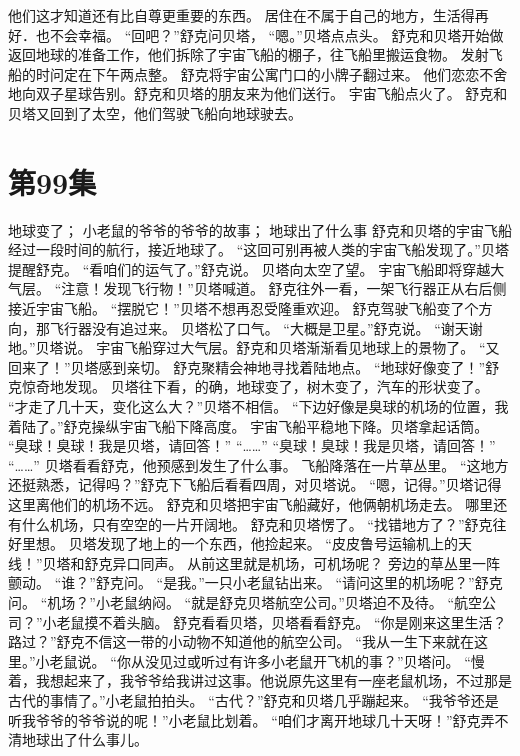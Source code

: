 \documentclass[a4paper,12pt,UTF8,twoside]{ctexbook}
\begin{document}
        他们这才知道还有比自尊更重要的东西。 
        居住在不属于自己的地方，生活得再好．也不会幸福。 
        “回吧？”舒克问贝塔， 
        “嗯。”贝塔点点头。 
        舒克和贝塔开始做返回地球的准备工作，他们拆除了宇宙飞船的棚子，往飞船里搬运食物。 
        发射飞船的时问定在下午两点整。 
        舒克将宇宙公寓门口的小牌子翻过来。 
        他们恋恋不舍地向双子星球告别。舒克和贝塔的朋友来为他们送行。 
        宇宙飞船点火了。 
        舒克和贝塔又回到了太空，他们驾驶飞船向地球驶去。   \chapter{第99集} 
        地球变了； 
        小老鼠的爷爷的爷爷的故事； 
        地球出了什么事   
        舒克和贝塔的宇宙飞船经过一段时间的航行，接近地球了。 
        “这回可别再被人类的宇宙飞船发现了。”贝塔提醒舒克。 
        “看咱们的运气了。”舒克说。 
        贝塔向太空了望。 
        宇宙飞船即将穿越大气层。 
        “注意！发现飞行物！”贝塔喊道。 
        舒克往外一看，一架飞行器正从右后侧接近宇宙飞船。 
        “摆脱它！”贝塔不想再忍受隆重欢迎。 
        舒克驾驶飞船变了个方向，那飞行器没有追过来。 
        贝塔松了口气。 
        “大概是卫星。”舒克说。 
        “谢天谢地。”贝塔说。 
        宇宙飞船穿过大气层。舒克和贝塔渐渐看见地球上的景物了。 
        “又回来了！”贝塔感到亲切。 
        舒克聚精会神地寻找着陆地点。 
        “地球好像变了！”舒克惊奇地发现。 
        贝塔往下看，的确，地球变了，树木变了，汽车的形状变了。 
        “才走了几十天，变化这么大？”贝塔不相信。 
        “下边好像是臭球的机场的位置，我着陆了。”舒克操纵宇宙飞船下降高度。 
        宇宙飞船平稳地下降。贝塔拿起话筒。 
        “臭球！臭球！我是贝塔，请回答！” 
        “……” 
        “臭球！臭球！我是贝塔，请回答！” 
        “……” 
        贝塔看看舒克，他预感到发生了什么事。 
        飞船降落在一片草丛里。 
        “这地方还挺熟悉，记得吗？”舒克下飞船后看看四周，对贝塔说。 
        “嗯，记得。”贝塔记得这里离他们的机场不远。 
        舒克和贝塔把宇宙飞船藏好，他俩朝机场走去。 
        哪里还有什么机场，只有空空的一片开阔地。 
        舒克和贝塔愣了。 
        “找错地方了？”舒克往好里想。 
        贝塔发现了地上的一个东西，他捡起来。 
        “皮皮鲁号运输机上的天线！”贝塔和舒克异口同声。 
        从前这里就是机场，可机场呢？ 
        旁边的草丛里一阵颤动。 
        “谁？”舒克问。 
        “是我。”一只小老鼠钻出来。 
        “请问这里的机场呢？”舒克问。 
        “机场？”小老鼠纳闷。 
        “就是舒克贝塔航空公司。”贝塔迫不及待。 
        “航空公司？”小老鼠摸不着头脑。 
        舒克看看贝塔，贝塔看看舒克。 
        “你是刚来这里生活？路过？”舒克不信这一带的小动物不知道他的航空公司。 
        “我从一生下来就在这里。”小老鼠说。 
        “你从没见过或听过有许多小老鼠开飞机的事？”贝塔问。 
        “慢着，我想起来了，我爷爷给我讲过这事。他说原先这里有一座老鼠机场，不过那是古代的事情了。”小老鼠拍拍头。 
        “古代？”舒克和贝塔几乎蹦起来。 
        “我爷爷还是听我爷爷的爷爷说的呢！”小老鼠比划着。 
        “咱们才离开地球几十天呀！”舒克弄不清地球出了什么事儿。
\end{document}

